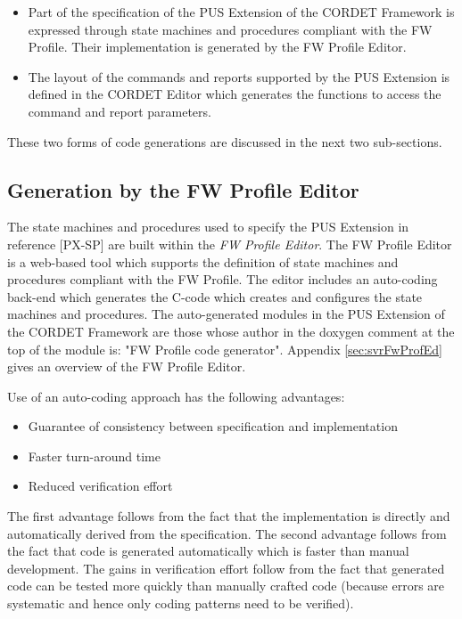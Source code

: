 \documentclass{pnp_article}
\begin{document}
\begin{itemize}
\item Part of the specification of the PUS Extension of the CORDET Framework is expressed through state machines and procedures compliant with the FW Profile. Their implementation is generated by the FW Profile Editor.
\item The layout of the commands and reports supported by the PUS Extension is defined in the CORDET Editor which generates the functions to access the command and report parameters.
\end{itemize}

These two forms of code generations are discussed in the next two sub-sections.

\subsection{Generation by the FW Profile Editor}
The state machines and procedures used to specify the PUS Extension in reference [PX-SP] are built within the \textit{FW Profile Editor}. The FW Profile Editor is a web-based tool which supports the definition of state machines and procedures compliant with the FW Profile. The editor includes an auto-coding back-end which generates the C-code which creates and configures the state machines and procedures. The auto-generated modules in the PUS Extension of the CORDET Framework are those whose author in the doxygen comment at the top of the module is: "FW Profile code generator". Appendix \ref{sec:svrFwProfEd} gives an overview of the FW Profile Editor.

Use of an auto-coding approach has the following advantages:

\begin{itemize}
\item Guarantee of consistency between specification and implementation 
\item Faster turn-around time 
\item Reduced verification effort 
\end{itemize}

The first advantage follows from the fact that the implementation is directly and automatically derived from the specification. The second advantage follows from the fact that code is generated automatically which is faster than manual development. The gains in verification effort follow from the fact that generated code can be tested more quickly than manually crafted code (because errors are systematic and hence only coding patterns need to be verified). 
\end{document}
